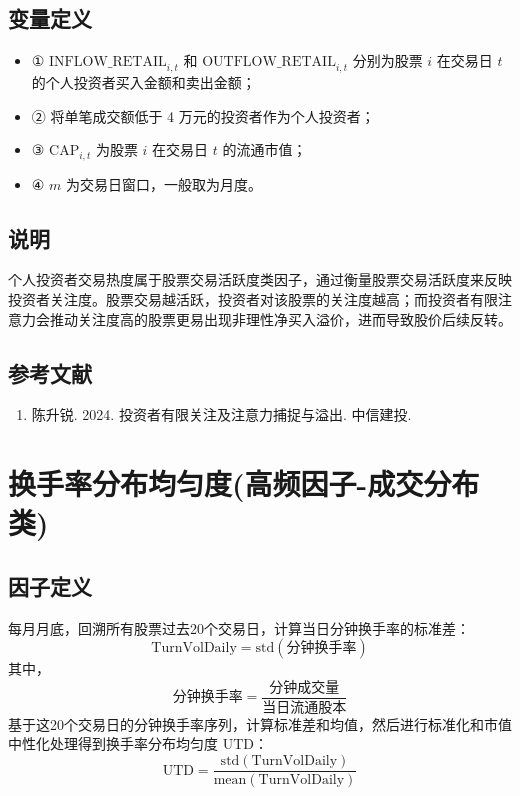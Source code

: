 \documentclass{article}
\begin{document}
\subsection{变量定义}
\begin{itemize}
    \item ① \(\mathrm{INFLOW\_RETAIL}_{i,t}\) 和 \(\mathrm{OUTFLOW\_RETAIL}_{i,t}\) 分别为股票 \(i\) 在交易日 \(t\) 的个人投资者买入金额和卖出金额；
    \item ② 将单笔成交额低于 4 万元的投资者作为个人投资者；
    \item ③ \(\mathrm{CAP}_{i,t}\) 为股票 \(i\) 在交易日 \(t\) 的流通市值；
    \item ④ \(m\) 为交易日窗口，一般取为月度。
\end{itemize}

\subsection{说明}
个人投资者交易热度属于股票交易活跃度类因子，通过衡量股票交易活跃度来反映投资者关注度。股票交易越活跃，投资者对该股票的关注度越高；而投资者有限注意力会推动关注度高的股票更易出现非理性净买入溢价，进而导致股价后续反转。

\subsection{参考文献}
\begin{enumerate}
    \item 陈升锐. 2024. 投资者有限关注及注意力捕捉与溢出. 中信建投.
\end{enumerate}

\section{换手率分布均匀度(高频因子-成交分布类)}

\subsection{因子定义}


每月月底，回溯所有股票过去20个交易日，计算当日分钟换手率的标准差：
\begin{equation}
    \mathrm{TurnVolDaily} = \mathrm{std}(\text{分钟换手率})
\end{equation}
其中，
\begin{equation}
    \text{分钟换手率} = \frac{\text{分钟成交量}}{\text{当日流通股本}}
\end{equation}
基于这20个交易日的分钟换手率序列，计算标准差和均值，然后进行标准化和市值中性化处理得到换手率分布均匀度 \(\mathrm{UTD}\)：
\begin{equation}
    \mathrm{UTD} = \frac{\mathrm{std}(\mathrm{TurnVolDaily})}{\mathrm{mean}(\mathrm{TurnVolDaily})}
\end{equation}
\end{document}

